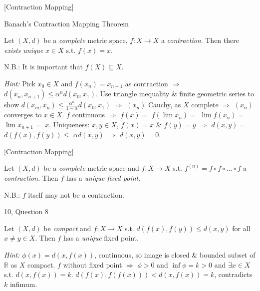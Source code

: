 \documentclass[10pt]{article} %
\newcommand{\cws}[2]{#1, Question #2}
\newcommand{\Hint}{\vspace{0.2em}\textit{Hint: }}
\renewcommand{\leq}{\leqslant}
\begin{document}
\begin{multicols}{3}
\begin{exercise}{[Contraction Mapping]}{}
\end{exercise}

\begin{theorem}{}{Banach's Contraction Mapping Theorem}

    Let $(X,d)$ be a \emph{complete} metric space, $f: X \to X$ a \emph{contraction}. Then there \emph{exists unique} $x \in X$ s.t. $f(x) = x$.

    N.B.: It is important that $f(X) \subseteq X$.

    \Hint Pick $x_0 \in X$ and $f(x_n) = x_{n+1}$ as contraction $\Rightarrow$ $d(x_n,x_{n+1}) \leq \alpha^n d(x_0,x_1)$. Use triangle inequality \& finite geometric series to show $d(x_m,x_n) \leq \displaystyle \frac{\alpha^n}{1 - \alpha} d(x_0,x_1)$ $\Rightarrow$ $(x_n)$ Cauchy, as $X$ complete $\Rightarrow$ $(x_n)$ converges to $x \in X$. $f$ continuous $\Rightarrow$ $f(x) = $ $f(\lim x_n) = $ $\lim f(x_n) = $ $\lim x_{n+1} = $ $x$. Uniqueness: $x,y \in X$, $f(x) = x$ \& $f(y) = y$ $\Rightarrow$ $d(x,y) =$ $d(f(x),f(y)) \leq $ $\alpha d(x,y)$ $\Rightarrow$ $d(x,y) = 0$.

\end{theorem}

\begin{exercise}{[Contraction Mapping]}{}

    Let $(X,d)$ be a \emph{complete} metric space and $f: X \to X$ s.t. $f^{(n)} = f \circ f \circ \hdots \circ f$ a \emph{contraction}. Then $f$ has a \emph{unique fixed point}.

    N.B.: $f$ itself may not be a contraction.

\end{exercise}

\begin{workshop}{\cws{10}{8}}{}

    Let $(X,d)$ be \emph{compact} and $f: X \to X$ s.t. $d(f(x),f(y)) \leq d(x,y)$ for all $x \neq y \in X$. Then $f$ has a \emph{unique} fixed point.

    \Hint $\phi(x) = d(x,f(x))$, continuous, so image is closed \& bounded subset of $\mathbb{R}$ as $X$ compact. $f$ without fixed point $\Rightarrow$ $\phi > 0$ and $\inf \phi = k > 0$ and $\exists x \in X$ s.t. $d(x,f(x)) = k$. $d(f(x),f(f(x))) < d(x,f(x)) = k$, contradicts $k$ infimum.

\end{workshop}


\end{multicols}
\end{document}
